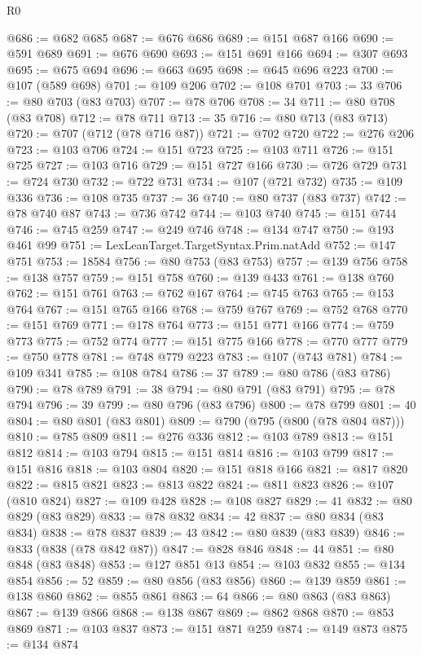 \begin{lexlean}{R0}
\begin{coremodule}
@686 := @682 @685
@687 := @676 @686
@689 := @151 @687 @166
@690 := @591 @689
@691 := @676 @690
@693 := @151 @691 @166
@694 := @307 @693
@695 := @675 @694
@696 := @663 @695
@698 := @645 @696 @223
@700 := @107 (@589 @698)
@701 := @109 @206
@702 := @108 @701
@703 := 33
@706 := @80 @703 (@83 @703)
@707 := @78 @706
@708 := 34
@711 := @80 @708 (@83 @708)
@712 := @78 @711
@713 := 35
@716 := @80 @713 (@83 @713)
@720 := @707 (@712 (@78 @716 @87))
@721 := @702 @720
@722 := @276 @206
@723 := @103 @706
@724 := @151 @723
@725 := @103 @711
@726 := @151 @725
@727 := @103 @716
@729 := @151 @727 @166
@730 := @726 @729
@731 := @724 @730
@732 := @722 @731
@734 := @107 (@721 @732)
@735 := @109 @336
@736 := @108 @735
@737 := 36
@740 := @80 @737 (@83 @737)
@742 := @78 @740 @87
@743 := @736 @742
@744 := @103 @740
@745 := @151 @744
@746 := @745 @259
@747 := @249 @746
@748 := @134 @747
@750 := @193 @461 @99
@751 := LexLeanTarget.TargetSyntax.Prim.natAdd
@752 := @147 @751
@753 := 18584
@756 := @80 @753 (@83 @753)
@757 := @139 @756
@758 := @138 @757
@759 := @151 @758
@760 := @139 @433
@761 := @138 @760
@762 := @151 @761
@763 := @762 @167
@764 := @745 @763
@765 := @153 @764
@767 := @151 @765 @166
@768 := @759 @767
@769 := @752 @768
@770 := @151 @769
@771 := @178 @764
@773 := @151 @771 @166
@774 := @759 @773
@775 := @752 @774
@777 := @151 @775 @166
@778 := @770 @777
@779 := @750 @778
@781 := @748 @779 @223
@783 := @107 (@743 @781)
@784 := @109 @341
@785 := @108 @784
@786 := 37
@789 := @80 @786 (@83 @786)
@790 := @78 @789
@791 := 38
@794 := @80 @791 (@83 @791)
@795 := @78 @794
@796 := 39
@799 := @80 @796 (@83 @796)
@800 := @78 @799
@801 := 40
@804 := @80 @801 (@83 @801)
@809 := @790 (@795 (@800 (@78 @804 @87)))
@810 := @785 @809
@811 := @276 @336
@812 := @103 @789
@813 := @151 @812
@814 := @103 @794
@815 := @151 @814
@816 := @103 @799
@817 := @151 @816
@818 := @103 @804
@820 := @151 @818 @166
@821 := @817 @820
@822 := @815 @821
@823 := @813 @822
@824 := @811 @823
@826 := @107 (@810 @824)
@827 := @109 @428
@828 := @108 @827
@829 := 41
@832 := @80 @829 (@83 @829)
@833 := @78 @832
@834 := 42
@837 := @80 @834 (@83 @834)
@838 := @78 @837
@839 := 43
@842 := @80 @839 (@83 @839)
@846 := @833 (@838 (@78 @842 @87))
@847 := @828 @846
@848 := 44
@851 := @80 @848 (@83 @848)
@853 := @127 @851 @13
@854 := @103 @832
@855 := @134 @854
@856 := 52
@859 := @80 @856 (@83 @856)
@860 := @139 @859
@861 := @138 @860
@862 := @855 @861
@863 := 64
@866 := @80 @863 (@83 @863)
@867 := @139 @866
@868 := @138 @867
@869 := @862 @868
@870 := @853 @869
@871 := @103 @837
@873 := @151 @871 @259
@874 := @149 @873
@875 := @134 @874

\end{coremodule}
\end{lexlean}
